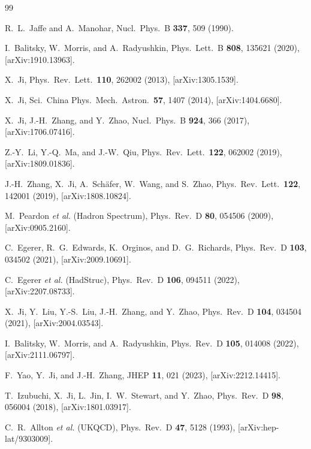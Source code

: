\documentclass[11pt,a4paper]{article}
\begin{document}
\begin{thebibliography}{99}

R.~L.~Jaffe and A.~Manohar,
Nucl.\ Phys.\ B \textbf{337}, 509 (1990).

I.~Balitsky, W.~Morris, and A.~Radyushkin,
Phys.\ Lett.\ B \textbf{808}, 135621 (2020),
[arXiv:1910.13963].

X.~Ji,
Phys.\ Rev.\ Lett.\ \textbf{110}, 262002 (2013),
[arXiv:1305.1539].

X.~Ji,
Sci.\ China Phys.\ Mech.\ Astron.\ \textbf{57}, 1407 (2014),
[arXiv:1404.6680].

X.~Ji, J.-H.~Zhang, and Y.~Zhao,
Nucl.\ Phys.\ B \textbf{924}, 366 (2017),
[arXiv:1706.07416].

Z.-Y.~Li, Y.-Q.~Ma, and J.-W.~Qiu,
Phys.\ Rev.\ Lett.\ \textbf{122}, 062002 (2019),
[arXiv:1809.01836].

J.-H.~Zhang, X.~Ji, A.~Sch\"afer, W.~Wang, and S.~Zhao,
Phys.\ Rev.\ Lett.\ \textbf{122}, 142001 (2019),
[arXiv:1808.10824].

M.~Peardon \textit{et al.} (Hadron Spectrum),
Phys.\ Rev.\ D \textbf{80}, 054506 (2009),
[arXiv:0905.2160].

C.~Egerer, R.~G.~Edwards, K.~Orginos, and D.~G.~Richards,
Phys.\ Rev.\ D \textbf{103}, 034502 (2021),
[arXiv:2009.10691].

C.~Egerer \textit{et al.} (HadStruc),
Phys.\ Rev.\ D \textbf{106}, 094511 (2022),
[arXiv:2207.08733].

X.~Ji, Y.~Liu, Y.-S.~Liu, J.-H.~Zhang, and Y.~Zhao,
Phys.\ Rev.\ D \textbf{104}, 034504 (2021),
[arXiv:2004.03543].

I.~Balitsky, W.~Morris, and A.~Radyushkin,
Phys.\ Rev.\ D \textbf{105}, 014008 (2022),
[arXiv:2111.06797].

F.~Yao, Y.~Ji, and J.-H.~Zhang,
JHEP \textbf{11}, 021 (2023),
[arXiv:2212.14415].

T.~Izubuchi, X.~Ji, L.~Jin, I.~W.~Stewart, and Y.~Zhao,
Phys.\ Rev.\ D \textbf{98}, 056004 (2018),
[arXiv:1801.03917].

C.~R.~Allton \textit{et al.} (UKQCD),
Phys.\ Rev.\ D \textbf{47}, 5128 (1993),
[arXiv:hep-lat/9303009].

\end{thebibliography}
\end{document}
